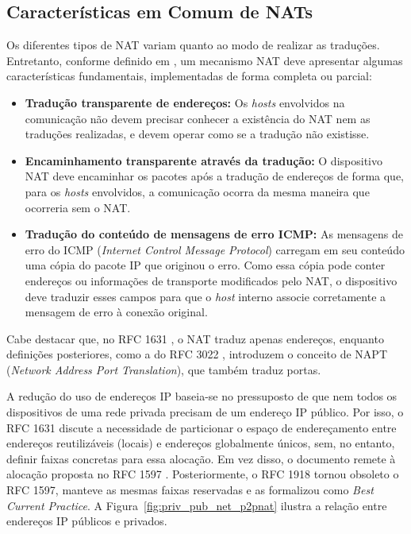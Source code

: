 \subsection{Características em Comum de NATs}

Os diferentes tipos de NAT variam quanto ao modo de realizar as traduções. Entretanto, conforme definido em \citep{RFC2663}, um mecanismo NAT deve apresentar algumas características fundamentais, implementadas de forma completa ou parcial:

\begin{itemize}
\item \textbf{Tradução transparente de endereços:} Os \textit{hosts} envolvidos na comunicação não devem precisar conhecer a existência do NAT nem as traduções realizadas, e devem operar como se a tradução não existisse.

\item \textbf{Encaminhamento transparente através da tradução:} O dispositivo NAT deve encaminhar os pacotes após a tradução de endereços de forma que, para os \textit{hosts} envolvidos, a comunicação ocorra da mesma maneira que ocorreria sem o NAT.

\item \textbf{Tradução do conteúdo de mensagens de erro ICMP:} As mensagens de erro do ICMP (\textit{Internet Control Message Protocol}) carregam em seu conteúdo uma cópia do pacote IP que originou o erro. Como essa cópia pode conter endereços ou informações de transporte modificados pelo NAT, o dispositivo deve traduzir esses campos para que o \textit{host} interno associe corretamente a mensagem de erro à conexão original.

\end{itemize}

Cabe destacar que, no RFC 1631 \citep{RFC1631}, o NAT traduz apenas endereços, enquanto definições posteriores, como a do RFC 3022 \citep{RFC3022}, introduzem o conceito de NAPT (\textit{Network Address Port Translation}), que também traduz portas.

A redução do uso de endereços IP baseia-se no pressuposto de que nem todos os dispositivos de uma rede privada precisam de um endereço IP público. Por isso, o RFC 1631 discute a necessidade de particionar o espaço de endereçamento entre endereços reutilizáveis (locais) e endereços globalmente únicos, sem, no entanto, definir faixas concretas para essa alocação. Em vez disso, o documento remete à alocação proposta no RFC 1597 \citep{rfc1597}. Posteriormente, o RFC 1918 \citep{rfc1918} tornou obsoleto o RFC 1597, manteve as mesmas faixas reservadas e as formalizou como \textit{Best Current Practice}. A Figura~\ref{fig:priv_pub_net_p2pnat} ilustra a relação entre endereços IP públicos e privados.

